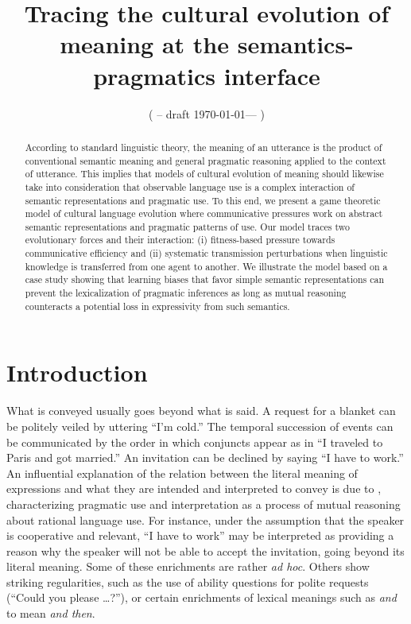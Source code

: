 \documentclass[a4paper]{article}
\title{Tracing the cultural evolution of meaning at the semantics-pragmatics interface}
\author{%
    ( -- draft \today --- )
}
\date{}
\begin{document}
\maketitle

\begin{abstract}
  According to standard linguistic theory, the meaning of an utterance is the product of 
  conventional semantic meaning and general pragmatic reasoning applied
  to the context of utterance. This implies that models of cultural evolution of meaning
  should likewise take into consideration that observable language use is a complex interaction
  of semantic representations and pragmatic use. To this end, we present a game theoretic model
  of cultural language evolution where communicative pressures work on abstract semantic
  representations and pragmatic patterns of use. Our model traces two evolutionary forces and
  their interaction: (i) fitness-based pressure towards communicative efficiency and (ii)
  systematic transmission perturbations when linguistic knowledge is transferred from one agent
  to another.  We illustrate the model based on a case study showing that learning biases that favor simple semantic
  representations can prevent the lexicalization of pragmatic inferences as long as mutual reasoning counteracts a potential loss in expressivity from such semantics. 
\end{abstract}

\section{Introduction}\label{sec:introduction}
What is conveyed usually goes beyond what is said. A request for a blanket can be politely
veiled by uttering ``I'm cold.'' The temporal succession of events can be communicated by the
order in which conjuncts appear as in ``I traveled to Paris and got married.'' An invitation
can be declined by saying ``I have to work.'' An influential explanation of the relation
between the literal meaning of expressions and what they are intended and interpreted to convey
is due to \citet{grice:1975}, characterizing pragmatic use and interpretation as a process of
mutual reasoning about rational language use. For instance, under the assumption that the
speaker is cooperative and relevant, ``I have to work'' may be interpreted as providing a
reason why the speaker will not be able to accept the invitation, going beyond its literal
meaning. Some of these enrichments are rather \emph{ad hoc}. Others show striking regularities,
such as the use of ability questions for polite requests (``Could you please \dots?''), or
certain enrichments of lexical meanings such as \emph{and} to mean \emph{and then}.
\end{document}
